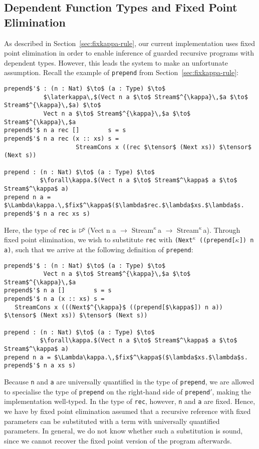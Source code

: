 \subsection{Dependent Function Types and Fixed Point Elimination}
\label{sec:depend-funct-types}
As described in Section~\ref{sec:fixkappa-rule}, our current implementation uses
fixed point elimination in order to enable inference of guarded recursive
programs with dependent types. However, this leads the system to make an
unfortunate assumption. Recall the example of \texttt{prepend} from
Section~\ref{sec:fixkappa-rule}:
\begin{lstlisting}[mathescape]
prepend$'$ : (n : Nat) $\to$ (a : Type) $\to$
           $\laterkappa\,$(Vect n a $\to$ Stream$^{\kappa}\,$a $\to$ Stream$^{\kappa}\,$a) $\to$ 
           Vect n a $\to$ Stream$^{\kappa}\,$a $\to$ Stream$^{\kappa}\,$a
prepend$'$ n a rec []        s = s 
prepend$'$ n a rec (x :: xs) s = 
                    StreamCons x ((rec $\tensor$ (Next xs)) $\tensor$ (Next s))

prepend : (n : Nat) $\to$ (a : Type) $\to$ 
          $\forall\kappa.$(Vect n a $\to$ Stream$^\kappa$ a $\to$ Stream$^\kappa$ a)
prepend n a = $\Lambda\kappa.\,$fix$^\kappa$($\lambda$rec.$\lambda$xs.$\lambda$s. prepend$'$ n a rec xs s)
\end{lstlisting}
Here, the type of \texttt{rec} is {$\rhd^{\!\!\kappa}\,$(Vect n a $\to$
  Stream$^{\kappa}\,$a $\to$ Stream$^{\kappa}\,$a)}. Through fixed point
elimination, we wish to substitute \texttt{rec} with \texttt{{(Next$^{\kappa}$
    ((prepend[$\kappa$]) n a)}}, such that we arrive at the following definition
of \texttt{prepend}:
\begin{lstlisting}[mathescape]
prepend$'$ : (n : Nat) $\to$ (a : Type) $\to$
           Vect n a $\to$ Stream$^{\kappa}\,$a $\to$ Stream$^{\kappa}\,$a
prepend$'$ n a []        s = s 
prepend$'$ n a (x :: xs) s = 
   StreamCons x (((Next$^{\kappa}$ ((prepend[$\kappa$]) n a)) $\tensor$ (Next xs)) $\tensor$ (Next s))

prepend : (n : Nat) $\to$ (a : Type) $\to$ 
          $\forall\kappa.$(Vect n a $\to$ Stream$^\kappa$ a $\to$ Stream$^\kappa$ a)
prepend n a = $\Lambda\kappa.\,$fix$^\kappa$($\lambda$xs.$\lambda$s. prepend$'$ n a xs s)
\end{lstlisting}
Because \texttt{n} and \texttt{a} are universally quantified in the type of
\texttt{prepend}, we are allowed to specialise the type of \texttt{prepend} on
the right-hand side of \texttt{prepend$'$}, making the implementation
well-typed. In the type of \texttt{rec}, however, \texttt{n} and \texttt{a} are
fixed. Hence, we have by fixed point elimination assumed that a recursive
reference with fixed parameters can be substituted with a term with universally
quantified parameters. In general, we do not know whether such a substitution is sound, since we
cannot recover the fixed point version of the program afterwards.

